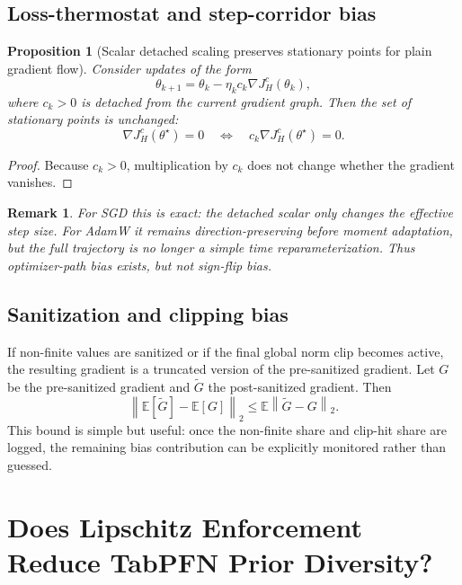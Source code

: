 \documentclass[11pt]{article}
\newtheorem{proposition}{Proposition}
\newtheorem{remark}{Remark}
\newcommand{\E}{\mathbb{E}}
\newcommand{\1}{\mathbf{1}}
\newcommand{\norm}[1]{\left\lVert #1 \right\rVert}
\begin{document}
\subsection{Loss-thermostat and step-corridor bias}
\begin{proposition}[Scalar detached scaling preserves stationary points for plain gradient flow]
Consider updates of the form
\begin{equation}
  \theta_{k+1}
  =
  \theta_k - \eta_k c_k \nabla J_H^c(\theta_k),
\end{equation}
where $c_k > 0$ is detached from the current gradient graph. Then the set of stationary points is unchanged:
\begin{equation}
  \nabla J_H^c(\theta^\star)=0
  \quad\Longleftrightarrow\quad
  c_k \nabla J_H^c(\theta^\star)=0.
\end{equation}
\end{proposition}

\begin{proof}
Because $c_k > 0$, multiplication by $c_k$ does not change whether the gradient vanishes.
\end{proof}

\begin{remark}
For SGD this is exact: the detached scalar only changes the effective step size. For AdamW it remains direction-preserving before moment adaptation, but the full trajectory is no longer a simple time reparameterization. Thus optimizer-path bias exists, but not sign-flip bias.
\end{remark}

\subsection{Sanitization and clipping bias}
If non-finite values are sanitized or if the final global norm clip becomes active, the resulting gradient is a truncated version of the pre-sanitized gradient. Let $G$ be the pre-sanitized gradient and $\widetilde{G}$ the post-sanitized gradient. Then
\begin{equation}
  \norm{\E[\widetilde{G}] - \E[G]}_2
  \le
  \E \norm{\widetilde{G} - G}_2.
\end{equation}
This bound is simple but useful: once the non-finite share and clip-hit share are logged, the remaining bias contribution can be explicitly monitored rather than guessed.

\section{Does Lipschitz Enforcement Reduce TabPFN Prior Diversity?}
\end{document}
